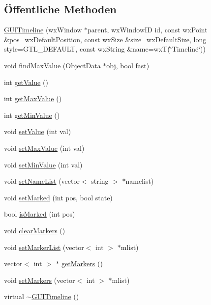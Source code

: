 \subsection*{Öffentliche Methoden}
\begin{DoxyCompactItemize}
\item 
\hyperlink{classGUITimeline_a2878c5574a3c329032e9cd94ab024d59}{G\-U\-I\-Timeline} (wx\-Window $\ast$parent, wx\-Window\-I\-D id, const wx\-Point \&pos=wx\-Default\-Position, const wx\-Size \&size=wx\-Default\-Size, long style=G\-T\-L\-\_\-\-D\-E\-F\-A\-U\-L\-T, const wx\-String \&name=wx\-T(\char`\"{}Timeline\char`\"{}))
\item 
void \hyperlink{classGUITimeline_a099f3654aa6e7ea04df861851a0e9ec8}{find\-Max\-Value} (\hyperlink{classObjectData}{Object\-Data} $\ast$obj, bool fast)
\item 
int \hyperlink{classGUITimeline_a1fa405314a0be38d95798fdc205827c3}{get\-Value} ()
\item 
int \hyperlink{classGUITimeline_a90b85dd56a32b3b35498a09b116b3610}{get\-Max\-Value} ()
\item 
int \hyperlink{classGUITimeline_aec94daa9bf66cd493b970b8ebb1334d5}{get\-Min\-Value} ()
\item 
void \hyperlink{classGUITimeline_a0fa4ef5ed2e0fe5f416d9d4c75b86ebc}{set\-Value} (int val)
\item 
void \hyperlink{classGUITimeline_a0bb2939f43fcefbeed5dfee827eaca9e}{set\-Max\-Value} (int val)
\item 
void \hyperlink{classGUITimeline_ae75bc611225782e26402896771705821}{set\-Min\-Value} (int val)
\item 
void \hyperlink{classGUITimeline_a115bcd521b18f812b8251a169dbf2454}{set\-Name\-List} (vector$<$ string $>$ $\ast$namelist)
\item 
void \hyperlink{classGUITimeline_a81c8e30bdf856cf05dbc9ae32f1b0690}{set\-Marked} (int pos, bool state)
\item 
bool \hyperlink{classGUITimeline_a7d9d402a76a47f7e968c6b5dd84efcb0}{is\-Marked} (int pos)
\item 
void \hyperlink{classGUITimeline_a9ffbeec8aa87350a623e4af4f2aba03d}{clear\-Markers} ()
\item 
void \hyperlink{classGUITimeline_aac5565f407354a3b3cfa9071a3486daa}{set\-Marker\-List} (vector$<$ int $>$ $\ast$mlist)
\item 
vector$<$ int $>$ $\ast$ \hyperlink{classGUITimeline_a0475107a9485faf7b9bf8836de3d8016}{get\-Markers} ()
\item 
void \hyperlink{classGUITimeline_a48087c3b671d161fe04585f478dabd99}{set\-Markers} (vector$<$ int $>$ $\ast$mlist)
\item 
virtual \hyperlink{classGUITimeline_aa912aa353abcfc4127c05269141adf83}{$\sim$\-G\-U\-I\-Timeline} ()
\end{DoxyCompactItemize}
